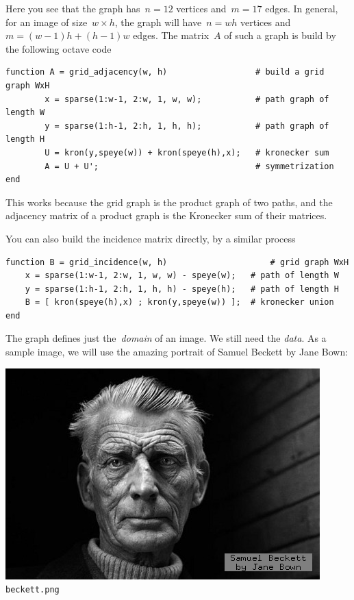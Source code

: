 Here you see that the graph has~$n=12$ vertices and~$m=17$ edges.
In general, for an image of size~$w\times h$, the graph will have~$n=wh$
vertices and~$m=(w-1)h+(h-1)w$ edges.  The matrix~$A$ of such a graph is
build by the following octave code

\begin{verbatim}
function A = grid_adjacency(w, h)                  # build a grid graph WxH
        x = sparse(1:w-1, 2:w, 1, w, w);           # path graph of length W
        y = sparse(1:h-1, 2:h, 1, h, h);           # path graph of length H
        U = kron(y,speye(w)) + kron(speye(h),x);   # kronecker sum
        A = U + U';                                # symmetrization
end
\end{verbatim}

This works because the grid graph is the product graph of two paths, and the
adjacency matrix of a product graph is the Kronecker sum of their matrices.

You can also build the incidence matrix directly, by a similar process

\begin{verbatim}
function B = grid_incidence(w, h)                     # grid graph WxH
	x = sparse(1:w-1, 2:w, 1, w, w) - speye(w);   # path of length W
	y = sparse(1:h-1, 2:h, 1, h, h) - speye(h);   # path of length H
	B = [ kron(speye(h),x) ; kron(y,speye(w)) ];  # kronecker union
end
\end{verbatim}

The graph defines just the~\emph{domain} of an image.  We still need the
\emph{data}.  As a sample image, we will use the amazing portrait of Samuel
Beckett by Jane Bown:

\includegraphics{i/beckett.png}
\verb+beckett.png+

